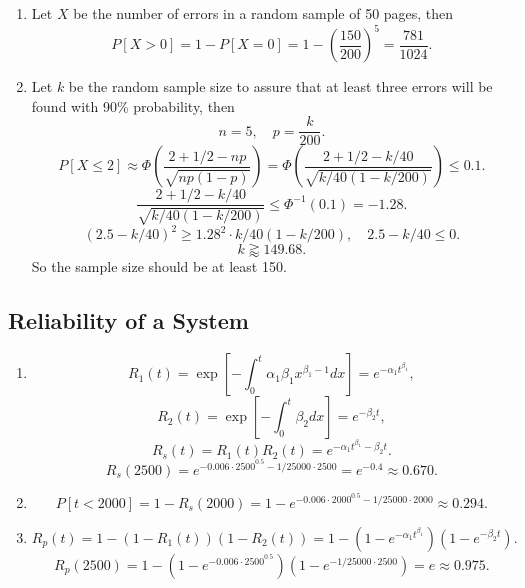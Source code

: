 \documentclass[11pt,a4paper]{article}
\begin{document}
\begin{enumerate}[label=\roman*)]
\item
Let $X$ be the number of errors in a random sample of 50 pages, then
$$P[X>0]=1-P[X=0]=1-\left(\frac{150}{200}\right)^5=\frac{781}{1024}.$$
\item
Let $k$ be the random sample size to assure that at least three errors will be found with 90\% probability, then
$$n=5,\quad p=\frac{k}{200}.$$
$$P[X\leqslant 2]\approx\Phi\left(\frac{2+1/2-np}{\sqrt{np(1-p)}}\right)=\Phi\left(\frac{2+1/2-k/40}{\sqrt{k/40(1-k/200)}}\right)\leqslant0.1.$$
$$\frac{2+1/2-k/40}{\sqrt{k/40(1-k/200)}}\leqslant\Phi^{-1}(0.1)=-1.28.$$
$$(2.5-k/40)^2\geqslant1.28^2\cdot k/40(1-k/200),\quad 2.5-k/40\leqslant 0.$$
$$k\gtrapprox 149.68.$$
So the sample size should be at least 150.
\end{enumerate}

\subsection{Reliability of a System}
\begin{enumerate}[label=\roman*)]
\item 
$$R_1(t)=\exp\left[-\int_0^t\alpha_1\beta_1 x^{\beta_1-1}dx\right]=e^{-\alpha_1 t^{\beta_1}},$$
$$R_2(t)=\exp\left[-\int_0^t\beta_2 dx\right]=e^{-\beta_2 t},$$
$$R_s(t)=R_1(t)R_2(t)=e^{-\alpha_1t^{\beta_1}-\beta_2 t}.$$
$$R_s(2500)=e^{-0.006\cdot2500^{0.5}-1/25000\cdot2500}=e^{-0.4}\approx0.670.$$
\item
$$P[t<2000]=1-R_s(2000)=1-e^{-0.006\cdot2000^{0.5}-1/25000\cdot2000}\approx0.294.$$
\item
$$R_p(t)=1-(1-R_1(t))(1-R_2(t))=1-(1-e^{-\alpha_1 t^{\beta_1}})(1-e^{-\beta_2 t}).$$
$$R_p(2500)=1-(1-e^{-0.006\cdot2500^{0.5}})(1-e^{-1/25000\cdot2500})=e\approx0.975.$$
\end{enumerate}
\end{document}
